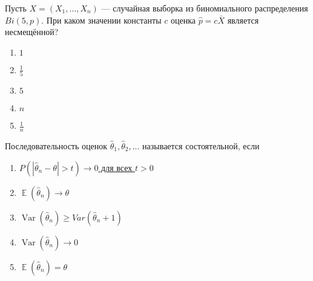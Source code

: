 \documentclass[t]{beamer}
\DeclareMathOperator{\Var}{Var}
\DeclareMathOperator{\E}{\mathbb{E}}
\begin{document}
 \begin{frame} \label{43} 
\begin{block}{43} 

Пусть $X = (X_1, \ldots , X_n)$ — случайная выборка из биномиального распределения $Bi(5, p)$. При каком значении константы $c$ оценка  $\hat{p} = c \bar{X}$ является несмещённой?
  


 \end{block} 
\begin{enumerate} 
\item[] \hyperlink{43-No}{\beamergotobutton{} $1$}
\item[] \hyperlink{43-Yes}{\beamergotobutton{} $\frac{1}{5}$}
\item[] \hyperlink{43-No}{\beamergotobutton{} $5$}
\item[] \hyperlink{43-No}{\beamergotobutton{} $n$}
\item[] \hyperlink{43-No}{\beamergotobutton{} $\frac{1}{n}$}
\end{enumerate} 
\end{frame} 


 \begin{frame} \label{44} 
\begin{block}{44} 

Последовательность оценок $\hat{\theta}_1, \hat{\theta}_2, ...$ называется состоятельной, если
  


 \end{block} 
\begin{enumerate} 
\item[] \hyperlink{44-Yes}{\beamergotobutton{} $P(|\hat\theta_n - \theta | > t) \to 0$ для всех $t > 0$}
\item[] \hyperlink{44-No}{\beamergotobutton{} $\E(\hat\theta_n) \to \theta$}
\item[] \hyperlink{44-No}{\beamergotobutton{} $\Var(\hat\theta_n) \geq Var(\hat\theta_n + 1)$}
\item[] \hyperlink{44-No}{\beamergotobutton{} $\Var(\hat\theta_n) \to 0$}
\item[] \hyperlink{44-No}{\beamergotobutton{} $\E(\hat\theta_n) = \theta$}
\end{enumerate} 
\end{frame} 
\end{document}
